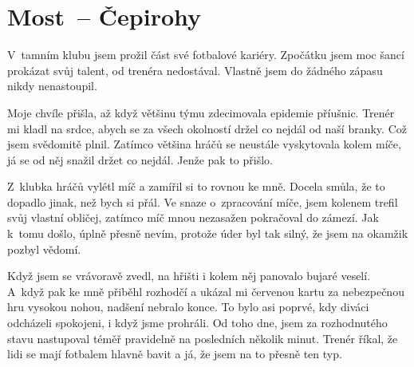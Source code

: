 
\chapter{Most~-- Čepirohy}

V~tamním klubu jsem prožil část své fotbalové kariéry. Zpočátku jsem moc šancí
prokázat svůj talent, od trenéra nedostával. Vlastně jsem do žádného zápasu
nikdy nenastoupil.

Moje chvíle přišla, až když většinu týmu zdecimovala epidemie příušnic. Trenér
mi kladl na srdce, abych se za všech okolností držel co nejdál od naší branky.
Což jsem svědomitě plnil. Zatímco většina hráčů se neustále vyskytovala kolem
míče, já se od něj snažil držet co nejdál. Jenže pak to přišlo.

Z~klubka hráčů vylétl míč a zamířil si to rovnou ke mně. Docela smůla, že to
dopadlo jinak, než bych si přál. Ve snaze o~zpracování míče, jsem kolenem
trefil svůj vlastní obličej, zatímco míč mnou nezasažen pokračoval do zámezí.
Jak k~tomu došlo, úplně přesně nevím, protože úder byl tak silný, že jsem na
okamžik pozbyl vědomí.

Když jsem se vrávoravě zvedl, na hřišti i kolem něj panovalo bujaré veselí.
A~když pak ke mně přiběhl rozhodčí a ukázal mi červenou kartu za nebezpečnou hru
vysokou nohou, nadšení nebralo konce. To bylo asi poprvé, kdy diváci odcházeli
spokojeni, i když jsme prohráli. Od toho dne, jsem za rozhodnutého stavu
nastupoval téměř pravidelně na posledních několik minut. Trenér říkal, že lidi
se mají fotbalem hlavně bavit a já, že jsem na to přesně ten typ.


